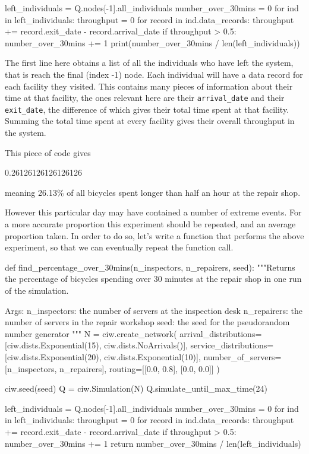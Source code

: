 \begin{pyin}
left_individuals = Q.nodes[-1].all_individuals
number_over_30mins = 0
for ind in left_individuals:
    throughput = 0
    for record in ind.data_records:
        throughput += record.exit_date - record.arrival_date
    if throughput > 0.5:
        number_over_30mins += 1
print(number_over_30mins / len(left_individuals))
\end{pyin}

The first line here obtains a list of all the individuals who have left the
system, that is reach the final (index -1) node.
Each individual will have a data record for each facility they visited. This
contains many pieces of information about their time at that facility, the ones
relevant here are their \texttt{arrival_date} and their
\texttt{exit_date}, the difference of which gives their total time
spent at that facility. Summing the total time spent at every facility gives
their overall throughput in the system.

This piece of code gives

\begin{pyout}
0.26126126126126126
\end{pyout}

meaning 26.13\% of all bicycles spent longer than half an hour at the repair
shop.

However this particular day may have contained a number of extreme events.
For a more accurate proportion this experiment should be repeated, and an
average proportion taken.
In order to do so, let's write a function that performs the above experiment, so
that we can eventually repeat the function call.

\begin{pyin}
def find_percentage_over_30mins(n_inspectors, n_repairers, seed):
    """Returns the percentage of bicycles spending over 30 minutes
    at the repair shop in one run of the simulation.
    
    Args:
        n_inspectors: the number of servers at the inspection desk
        n_repairers: the number of servers in the repair workshop
        seed: the seed for the pseudorandom number generator
    """
    N = ciw.create_network(
        arrival_distributions=[ciw.dists.Exponential(15), ciw.dists.NoArrivals()],
        service_distributions=[ciw.dists.Exponential(20), ciw.dists.Exponential(10)],
        number_of_servers=[n_inspectors, n_repairers],
        routing=[[0.0, 0.8], [0.0, 0.0]]
    )

    ciw.seed(seed)
    Q = ciw.Simulation(N)
    Q.simulate_until_max_time(24)

    left_individuals = Q.nodes[-1].all_individuals
    number_over_30mins = 0
    for ind in left_individuals:
        throughput = 0
        for record in ind.data_records:
            throughput += record.exit_date - record.arrival_date
        if throughput > 0.5:
            number_over_30mins += 1
    return number_over_30mins / len(left_individuals)
\end{pyin}

